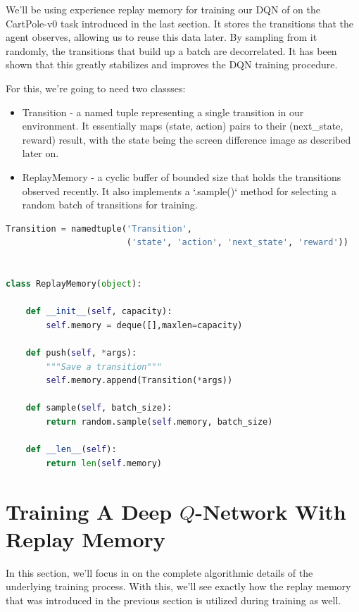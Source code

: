 We’ll be using experience replay memory for training our DQN of on the CartPole-v0 task 
introduced in the last section. It stores the transitions that the agent observes, 
allowing us to reuse this data later. By sampling from it randomly, the transitions that 
build up a batch are decorrelated. It has been shown that this greatly stabilizes and 
improves the DQN training procedure.

For this, we’re going to need two classses:

\begin{itemize}
\setlength{\parskip}{0pt}
\item
Transition - a named tuple representing a single transition in our environment. It 
essentially maps (state, action) pairs to their (next\_state, reward) result, with the 
state being the screen difference image as described later on.

\item
ReplayMemory - a cyclic buffer of bounded size that holds the transitions observed 
recently. It also implements a `.sample()` method for selecting a random batch of 
transitions for training.
\end{itemize}

\begin{lstlisting}[language=Python]
Transition = namedtuple('Transition',
                        ('state', 'action', 'next_state', 'reward'))


class ReplayMemory(object):

    def __init__(self, capacity):
        self.memory = deque([],maxlen=capacity)

    def push(self, *args):
        """Save a transition"""
        self.memory.append(Transition(*args))

    def sample(self, batch_size):
        return random.sample(self.memory, batch_size)

    def __len__(self):
        return len(self.memory)
\end{lstlisting}


\section{Training A Deep $Q$-Network With Replay Memory}


In this section, we'll focus in on the complete algorithmic details of the underlying 
training process. With this, we'll see exactly how the replay memory that was introduced 
in the previous section is utilized during training as well.


